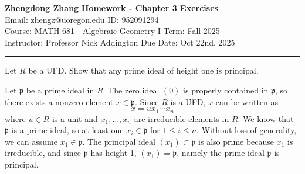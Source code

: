 \documentclass[letterpaper, 12pt]{article}
\begin{document}
\noindent
\large\textbf{Zhengdong Zhang} \hfill \textbf{Homework - Chapter 3 Exercises}   \\
Email: zhengz@uoregon.edu \hfill ID: 952091294 \\
\normalsize Course: MATH 681 - Algebraic Geometry I \hfill Term: Fall 2025 \\
Instructor: Professor Nick Addington \hfill Due Date: Oct 22nd, 2025 \\
\noindent\rule{7in}{2.8pt}
\begin{problem}{3.2}
Let \(R\) be a UFD. Show that any prime ideal of height one is principal.
\end{problem}
\begin{solution}
Let \(\mathfrak{p}\) be a prime ideal in \(R\). The zero ideal \((0)\) is properly contained in \(\mathfrak{p}\), so there exists a nonzero element \(x\in \mathfrak{p}\). Since \(R\) is a UFD, \(x\) can be written as 
\[x=ux_1\cdots x_n\]
where \(u\in R\) is a unit and \(x_1,\ldots,x_n\) are irreducible elements in \(R\). We know that \(\mathfrak{p}\) is a prime ideal, so at least one \(x_i\in \mathfrak{p}\) for \(1\leq i\leq n\). Without loss of generality, we can assume \(x_1\in \mathfrak{p}\). The principal ideal \((x_1)\subset \mathfrak{p}\) is also prime because \(x_1\) is irreducible, and since \(\mathfrak{p}\) has height 1, \((x_1)=\mathfrak{p}\), namely the prime ideal \(\mathfrak{p}\) is principal.
\end{solution}
\end{document}
